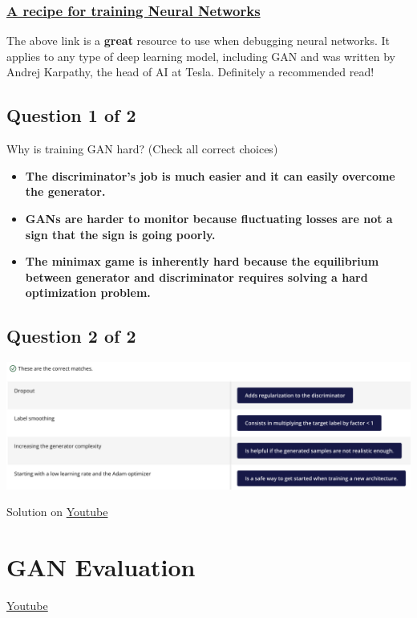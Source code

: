 \subsubsection{\href{http://karpathy.github.io/2019/04/25/recipe/}{\textbf{A recipe for training Neural Networks}}}

The above link is a \textbf{great} resource to use when debugging neural networks. It applies to any type of deep learning model, including GAN and was written by Andrej Karpathy, the head of AI at Tesla. Definitely a recommended read!

\subsection{Question 1 of 2}
Why is training GAN hard? (Check all correct choices)
\begin{itemize}
    \item \textbf{The discriminator's job is much easier and it can easily overcome the generator.}
    \item \textbf{GANs are harder to monitor because fluctuating losses are not a sign that the sign is going poorly.}
    \item \textbf{The minimax game is inherently hard because the equilibrium between generator and discriminator requires solving a hard optimization problem.}
\end{itemize}


\subsection{Question 2 of 2}

\includegraphics[width=1\linewidth]{img//genAdvNet//deepGAN/quiz2of2.png}


Solution on \href{https://www.youtube.com/watch?v=uS8L9eW6Jnk&t=1s}{Youtube}

\section{GAN Evaluation}
\href{https://www.youtube.com/watch?v=Dfmdp0CX-yk&t=2s}{Youtube} \newline

